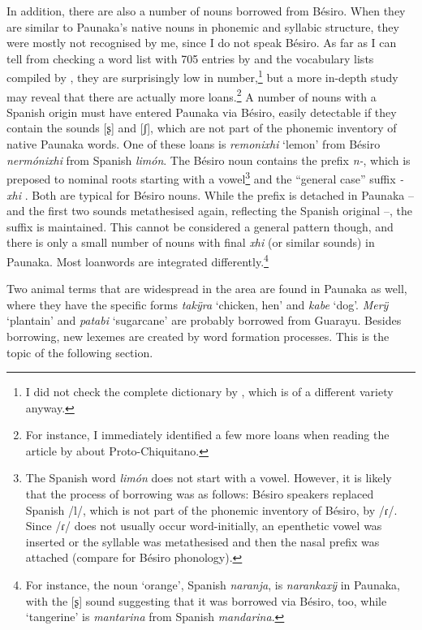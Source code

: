 In addition, there are also a number of nouns borrowed from Bésiro. When they are similar to Paunaka’s native nouns in phonemic and syllabic structure, they were mostly not recognised by me, since I do not speak Bésiro. As far as I can tell from checking a word list with 705 entries by \citet[]{Sans2010} and the vocabulary lists compiled by \citet[]{Pinto2010}, they are surprisingly low in number,\footnote{I did not check the complete dictionary by \citet[]{FussRiester1986}, which is of a different variety anyway.} but a more in-depth study may reveal that there are actually more loans.\footnote{For instance, I immediately identified a few more loans when reading the article by \citet[]{Nikulin2019} about Proto-Chiquitano.} A number of nouns with a Spanish origin must have entered Paunaka via Bésiro, easily detectable if they contain the sounds [ʂ] and [ʃ], which are not part of the phonemic inventory of native Paunaka words. One of these loans is \textit{remonixhi} ‘lemon’ from Bésiro \textit{nermónixhi} from Spanish \textit{limón}. The Bésiro noun contains the prefix \textit{n-}, which is preposed to nominal roots starting with a vowel\footnote{The Spanish word \textit{limón} does not start with a vowel. However, it is likely that the process of borrowing was as follows: Bésiro speakers replaced Spanish /l/, which is not part of the phonemic inventory of Bésiro, by /ɾ/. Since /ɾ/ does not usually occur word-initially, an epenthetic vowel was inserted or the syllable was metathesised and then the nasal prefix was attached (compare \citealt[]{Sans2010,Sans2013} for Bésiro phonology).} and the “general case” suffix \mbox{\textit{-xhi}} \citep[20]{Sans2013}. Both are typical for Bésiro nouns. While the prefix is detached in Paunaka – and the first two sounds metathesised again, reflecting the Spanish original –, the suffix is maintained. This cannot be considered a general pattern though, and there is only a small number of nouns with final \textit{xhi} (or similar sounds) in Paunaka. Most loanwords are integrated differently.\footnote{For instance, the noun ‘orange’, Spanish \textit{naranja}, is \textit{narankaxÿ} in Paunaka, with the [ʂ] sound suggesting that it was borrowed via Bésiro, too, while ‘tangerine’ is \textit{mantarina} from Spanish \textit{mandarina}.}

Two animal terms that are widespread in the area are found in Paunaka as well, where they have the specific forms \textit{takÿra} ‘chicken, hen’ and \textit{kabe} ‘dog’. \textit{Merÿ} ‘plantain’ and \textit{patabi} ‘sugarcane’ are probably borrowed from Guarayu. Besides borrowing, new lexemes are created by word formation processes. This is the topic of the following section.

